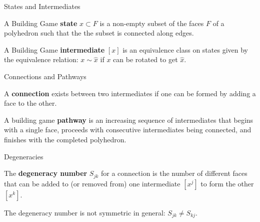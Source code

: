 \documentclass{beamer}
\begin{document}
\begin{frame}{States and Intermediates}
\begin{definition}
  A Building Game \textbf{state} $x \subset F$ is a non-empty subset of the faces $F$ of a polyhedron such that the the subset is connected along edges. 
\end{definition} 
\begin{definition}
A Building Game \textbf{intermediate} $[x]$ is an equivalence class on states given by the equivalence relation: $x \sim \hat{x}$ if $x$ can be rotated to get $\hat{x}$.
\end{definition}

\end{frame}
\begin{frame}{Connections and Pathways}
\begin{definition}
A \textbf{connection} exists between two intermediates if one can be formed by adding a face to the other.
\end{definition}
\begin{definition}
A building game \textbf{pathway} is an increasing sequence of intermediates that begins with a single face, proceeds with consecutive intermediates being connected, and finishes with the completed polyhedron.
\end{definition}

\end{frame}
\begin{frame}{Degeneracies}
\begin{definition}
The \textbf{degeneracy number} $S_{jk}$ for a connection is the number of different faces that can be added to (or removed from) one intermediate $[x^j]$ to form the other $[x^k]$.    
\end{definition}
The degeneracy number is not symmetric in general: $S_{jk} \neq S_{kj}$.

\centering
\end{frame}
\end{document}
